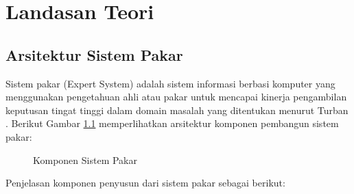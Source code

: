 \chapter{Landasan Teori}

\section {Arsitektur Sistem Pakar}
Sistem pakar (Expert System) adalah sistem informasi berbasi komputer yang menggunakan pengetahuan ahli atau pakar untuk mencapai kinerja pengambilan keputusan tingat tinggi dalam domain masalah yang ditentukan menurut Turban \cite{turban}. Berikut Gambar \ref{fig:komponen} memperlihatkan arsitektur komponen pembangun sistem pakar: 

\begin{figure}[h]	
	{\par}
	\caption{Komponen Sistem Pakar \cite{mca2015}}
	\label{fig:komponen}
\end{figure}
Penjelasan komponen penyusun dari sistem pakar sebagai berikut:

